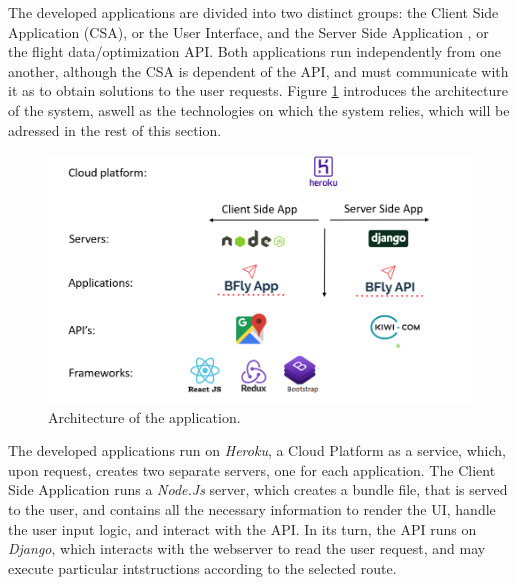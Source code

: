 The developed applications are divided into two distinct groups: the Client Side Application (CSA), or the User Interface,
and the Server Side Application , or the flight data/optimization API.
Both applications run independently from one another, although the CSA is dependent of the API,
and must communicate with it as to obtain solutions to the user requests.
Figure \ref{fig:system_architecture} introduces the architecture of the system,
aswell as the technologies on which the system relies, which will be adressed in the rest of this section. 


\begin{figure}[htpb]
  \centering
  \includegraphics[width=\textwidth]{./Figures/system_implementation/system_architecture_implementation.png}
  \caption{Architecture of the application.}
  \label{fig:system_architecture}  
\end{figure}


The developed applications run on \textit{Heroku}, a Cloud Platform as a service, 
which, upon request, creates two separate servers, one for each application.
The Client Side Application runs a \textit{Node.Js} server, which creates a 
bundle file, that is served to the user, and contains all the necessary information to render the UI, handle the user input logic,
and interact with the API. 
In its turn, the API runs on \textit{Django}, which interacts with the webserver to read the user request, 
and may execute particular intstructions according to the selected route.